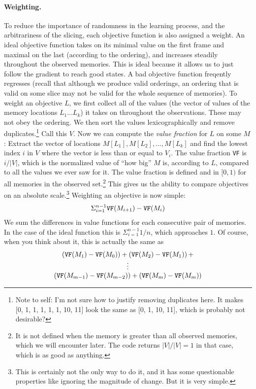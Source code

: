 \documentclass[twocolumn]{article}
\begin{document}
\paragraph{Weighting.} \label{sec:objectiveweighting} 
To reduce the importance of randomness in the
learning process, and the arbitrariness of the slicing, each objective
function is also assigned a weight. An ideal objective function takes
on its minimal value on the first frame and maximal on the last
(according to the ordering), and increases steadily throughout the
observed memories. This is ideal because it allows us to just follow
the gradient to reach good states. A bad objective function freqently
regresses (recall that although we produce valid orderings, an
ordering that is valid on some slice may not be valid for the whole
sequence of memories). To weight an objective $L$, we first collect
all of the values (the vector of values of the memory locations $L_1
\ldots L_k$) it takes on throughout the observations. These may not
obey the ordering. We then sort the values lexicographically and
remove duplicates.\footnote{Note to self: I'm not sure how to justify
  removing duplicates here. It makes [0, 1, 1, 1, 1, 1, 10, 11] look
  the same as [0, 1, 10, 11], which is probably not desirable?} Call
this $V$. Now we can compute the {\em value fraction} for $L$ on some
$M$: Extract the vector of locations $M[L_1], M[L_2], \ldots, M[L_k]$
and find the lowest index $i$ in $V$ where the vector is less than or
equal to $V_i$. The value fraction {\tt VF} is $i/|V|$, which is the
normalized value of ``how big'' $M$ is, according to $L$, compared to
all the values we ever saw for it. The value fraction is defined and
in $[0, 1)$ for all memories in the observed set.\footnote{It is not
    defined when the memory is greater than all observed memories,
    which we will encounter later. The code returns $|V|/|V| = 1$ in
    that case, which is as good as anything.} This gives us the
  ability to compare objectives on an absolute scale.\footnote{This is
    certainly not the only way to do it, and it has some questionable
    properties like ignoring the magnitude of change. But it is very
    simple.} Weighting an objective is now simple:
%
$$ \Sigma_{i=1}^{n-1}  {\tt VF}(M_{i+1}) - {\tt VF}(M_{i}) $$
%
We sum the differences in value functions for each consecutive pair of
memories. In the case of the ideal function this is $\Sigma_{i=1}^{n-1}
1/n$, which approaches $1$. Of course, when you think about it,
this is actually the same as
%
\[
\begin{array}{c}
({\tt VF}(M_1) - {\tt VF}(M_0)) + ({\tt VF}(M_2) - {\tt VF}(M_1)) \,+ \\
\vdots \\
({\tt VF}(M_{m-1}) - {\tt VF}(M_{m-2})) + ({\tt VF}(M_{m}) - {\tt VF}(M_{m}))
\end{array}
\]
\end{document}
